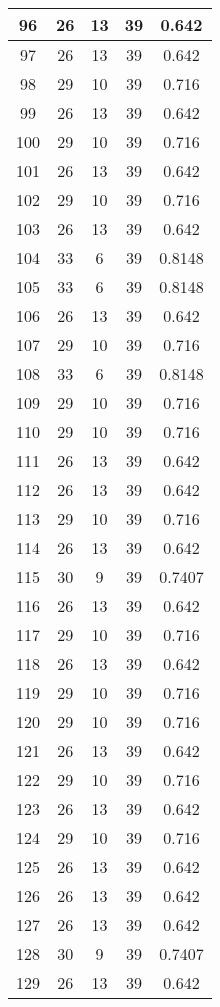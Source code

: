 \documentclass[letterpaper, 12pt]{article}
\begin{document}
\begin{longtable}{|c|c|c|c|c|}
\hline
96 & 26 & 13 & 39 & 0.642 \\
\hline
97 & 26 & 13 & 39 & 0.642 \\
\hline
98 & 29 & 10 & 39 & 0.716 \\
\hline
99 & 26 & 13 & 39 & 0.642 \\
\hline
100 & 29 & 10 & 39 & 0.716 \\
\hline
101 & 26 & 13 & 39 & 0.642 \\
\hline
102 & 29 & 10 & 39 & 0.716 \\
\hline
103 & 26 & 13 & 39 & 0.642 \\
\hline
104 & 33 & 6 & 39 & 0.8148 \\
\hline
105 & 33 & 6 & 39 & 0.8148 \\
\hline
106 & 26 & 13 & 39 & 0.642 \\
\hline
107 & 29 & 10 & 39 & 0.716 \\
\hline
108 & 33 & 6 & 39 & 0.8148 \\
\hline
109 & 29 & 10 & 39 & 0.716 \\
\hline
110 & 29 & 10 & 39 & 0.716 \\
\hline
111 & 26 & 13 & 39 & 0.642 \\
\hline
112 & 26 & 13 & 39 & 0.642 \\
\hline
113 & 29 & 10 & 39 & 0.716 \\
\hline
114 & 26 & 13 & 39 & 0.642 \\
\hline
115 & 30 & 9 & 39 & 0.7407 \\
\hline
116 & 26 & 13 & 39 & 0.642 \\
\hline
117 & 29 & 10 & 39 & 0.716 \\
\hline
118 & 26 & 13 & 39 & 0.642 \\
\hline
119 & 29 & 10 & 39 & 0.716 \\
\hline
120 & 29 & 10 & 39 & 0.716 \\
\hline
121 & 26 & 13 & 39 & 0.642 \\
\hline
122 & 29 & 10 & 39 & 0.716 \\
\hline
123 & 26 & 13 & 39 & 0.642 \\
\hline
124 & 29 & 10 & 39 & 0.716 \\
\hline
125 & 26 & 13 & 39 & 0.642 \\
\hline
126 & 26 & 13 & 39 & 0.642 \\
\hline
127 & 26 & 13 & 39 & 0.642 \\
\hline
128 & 30 & 9 & 39 & 0.7407 \\
\hline
129 & 26 & 13 & 39 & 0.642 \\

\end{longtable}
\end{document}

